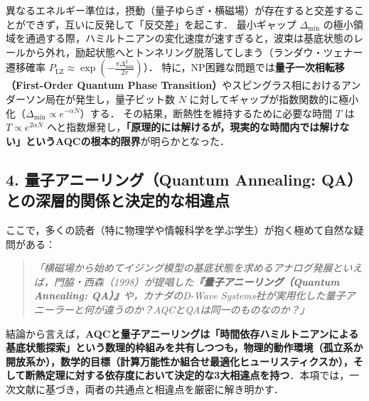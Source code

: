 \documentclass[11pt,a4paper,oneside,openany]{ltjsbook}
\theoremstyle{definition}
\theoremstyle{plain}
\theoremstyle{remark}
\begin{document}
異なるエネルギー準位は，摂動（量子ゆらぎ・横磁場）が存在すると交差することができず，互いに反発して「反交差」を起こす．
最小ギャップ $\Delta_{\min}$ の極小領域を通過する際，ハミルトニアンの変化速度が速すぎると，波束は基底状態のレールから外れ，励起状態へとトンネリング脱落してしまう（ランダウ・ツェナー遷移確率 $P_{\text{LZ}} \approx \exp\left(-\frac{\pi \Delta_{\min}^2}{2 v}\right)$）．
特に，NP困難な問題では\textbf{量子一次相転移（First-Order Quantum Phase Transition）}やスピングラス相におけるアンダーソン局在\cite{altshuler2010anderson}が発生し，量子ビット数 $N$ に対してギャップが指数関数的に極小化（$\Delta_{\min} \propto e^{-\alpha N}$）する．
その結果，断熱性を維持するために必要な時間 $T$ は $T \propto e^{2\alpha N}$ へと指数爆発し，\textbf{「原理的には解けるが，現実的な時間内では解けない」というAQCの根本的限界}が明らかとなった．

\subsection{4. 量子アニーリング（Quantum Annealing: QA）との深層的関係と決定的な相違点}
ここで，多くの読者（特に物理学や情報科学を学ぶ学生）が抱く極めて自然な疑問がある：
\begin{quote}
\textit{「横磁場から始めてイジング模型の基底状態を求めるアナログ発展といえば，門脇・西森（1998）が提唱した\textbf{『量子アニーリング（Quantum Annealing: QA）』}や，カナダのD-Wave Systems社が実用化した量子アニーラーと何が違うのか？AQCとQAは同一のものなのか？」}
\end{quote}
結論から言えば，\textbf{AQCと量子アニーリングは「時間依存ハミルトニアンによる基底状態探索」という数理的枠組みを共有しつつも，物理的動作環境（孤立系か開放系か），数学的目標（計算万能性か組合せ最適化ヒューリスティクスか），そして断熱定理に対する依存度において決定的な3大相違点を持つ}．本項では，一次文献\cite{kadowaki1998quantum,farhi2000quantum,aharonov2007adiabatic,albash2018adiabatic}に基づき，両者の共通点と相違点を厳密に解き明かす．
\end{document}
